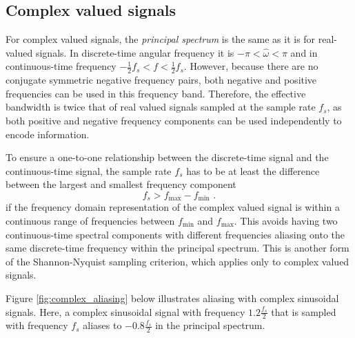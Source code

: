 \subsection{Complex valued signals}
For complex valued signals, the \emph{principal spectrum} is the same as it is for real-valued signals. In discrete-time angular frequency it is $-\pi<\hat{\omega}<\pi$ and in continuous-time frequency $-\frac{1}{2}f_s<f<\frac{1}{2}f_s$. However, because there are no conjugate symmetric negative frequency pairs, both negative and positive frequencies can be used in this frequency band. Therefore, the effective bandwidth is twice that of real valued signals sampled at the sample rate $f_s$, as both positive and negative frequency components can be used independently to encode information.

To ensure a one-to-one relationship between the discrete-time signal and the continuous-time signal, the sample rate $f_s$ has to be at least the difference between the largest and smallest frequency component
\begin{equation}
  \boxed{
    f_s > f_{\mathrm{max}}-f_{\mathrm{min}}
    }\,\,.
\end{equation}
if the frequency domain representation of the complex valued signal is within a continuous range of frequencies between $f_{\mathrm{min}}$ and $f_{\mathrm{max}}$. This avoids having two continuous-time spectral components with different frequencies aliasing onto the same discrete-time frequency within the principal spectrum. This is another form of the Shannon-Nyquist sampling criterion, which applies only to complex valued signals.

Figure \ref{fig:complex_aliasing} below illustrates aliasing with complex sinusoidal signals. Here, a complex sinusoidal signal with frequency $1.2\frac{f_s}{2}$ that is sampled with frequency $f_s$ aliases to $-0.8\frac{f_s}{2}$ in the principal spectrum.

